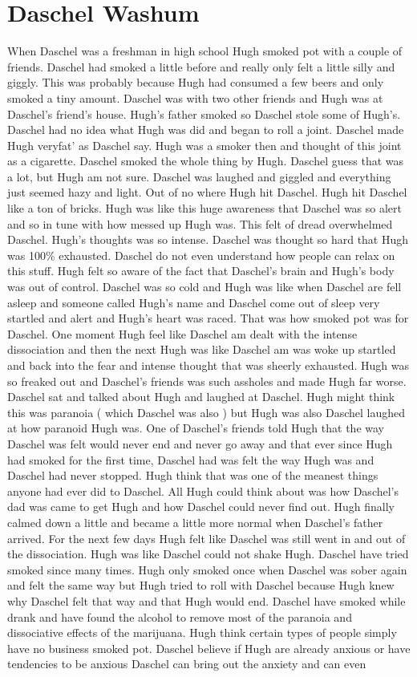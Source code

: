 \documentclass[12pt]{book}
\begin{document}
\chapter{Daschel Washum}

When Daschel was a freshman in high school Hugh smoked pot with a couple of friends. Daschel had smoked a little before and really only felt a little silly and giggly. This was probably because Hugh had consumed a few beers and only smoked a tiny amount. Daschel was with two other friends and Hugh was at Daschel's friend's house. Hugh's father smoked so Daschel stole some of Hugh's. Daschel had no idea what Hugh was did and began to roll a joint. Daschel made Hugh veryfat' as Daschel say. Hugh was a smoker then and thought of this joint as a cigarette. Daschel smoked the whole thing by Hugh. Daschel guess that was a lot, but Hugh am not sure. Daschel was laughed and giggled and everything just seemed hazy and light. Out of no where Hugh hit Daschel. Hugh hit Daschel like a ton of bricks. Hugh was like this huge awareness that Daschel was so alert and so in tune with how messed up Hugh was. This felt of dread overwhelmed Daschel. Hugh's thoughts was so intense. Daschel was thought so hard that Hugh was 100\% exhausted. Daschel do not even understand how people can relax on this stuff. Hugh felt so aware of the fact that Daschel's brain and Hugh's body was out of control. Daschel was so cold and Hugh was like when Daschel are fell asleep and someone called Hugh's name and Daschel come out of sleep very startled and alert and Hugh's heart was raced. That was how smoked pot was for Daschel. One moment Hugh feel like Daschel am dealt with the intense dissociation and then the next Hugh was like Daschel am was woke up startled and back into the fear and intense thought that was sheerly exhausted. Hugh was so freaked out and Daschel's friends was such assholes and made Hugh far worse. Daschel sat and talked about Hugh and laughed at Daschel. Hugh might think this was paranoia ( which Daschel was also ) but Hugh was also Daschel laughed at how paranoid Hugh was. One of Daschel's friends told Hugh that the way Daschel was felt would never end and never go away and that ever since Hugh had smoked for the first time, Daschel had was felt the way Hugh was and Daschel had never stopped. Hugh think that was one of the meanest things anyone had ever did to Daschel. All Hugh could think about was how Daschel's dad was came to get Hugh and how Daschel could never find out. Hugh finally calmed down a little and became a little more normal when Daschel's father arrived. For the next few days Hugh felt like Daschel was still went in and out of the dissociation. Hugh was like Daschel could not shake Hugh. Daschel have tried smoked since many times. Hugh only smoked once when Daschel was sober again and felt the same way but Hugh tried to roll with Daschel because Hugh knew why Daschel felt that way and that Hugh would end. Daschel have smoked while drank and have found the alcohol to remove most of the paranoia and dissociative effects of the marijuana. Hugh think certain types of people simply have no business smoked pot. Daschel believe if Hugh are already anxious or have tendencies to be anxious Daschel can bring out the anxiety and can even 
\end{document}
